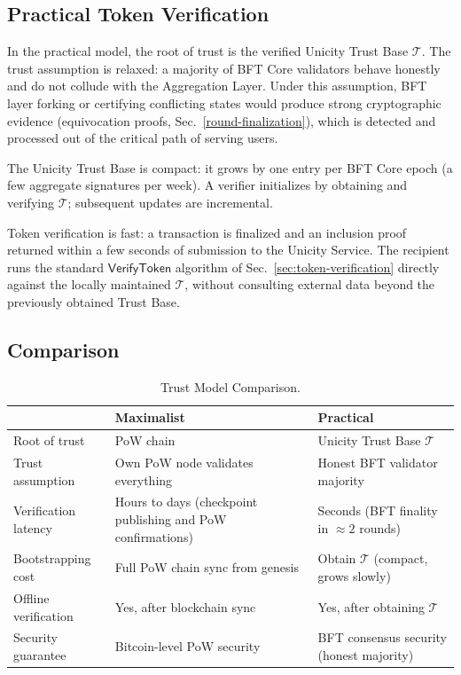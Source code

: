 \subsection{Practical Token Verification}\label{sec:practical-verification}

In the practical model, the root of trust is the verified Unicity Trust Base $\mathcal{T}$. The trust assumption is relaxed: a majority of BFT Core validators behave honestly and do not collude with the Aggregation Layer. Under this assumption, BFT layer forking or certifying conflicting states would produce strong cryptographic evidence (equivocation proofs, Sec.~\ref{round-finalization}), which is detected and processed out of the critical path of serving users.

The Unicity Trust Base is compact: it grows by one entry per BFT Core epoch (a few aggregate signatures per week). A verifier initializes by obtaining and verifying $\mathcal{T}$; subsequent updates are incremental.

Token verification is fast: a transaction is finalized and an inclusion proof returned within a few seconds of submission to the Unicity Service. The recipient runs the standard $\mathsf{VerifyToken}$ algorithm of Sec.~\ref{sec:token-verification} directly against the locally maintained $\mathcal{T}$, without consulting external data beyond the previously obtained Trust Base.


\subsection{Comparison}\label{sec:trust-comparison}

\begin{table}[!htbp]
  \begin{center}
    \caption{Trust Model Comparison.}\label{ta:trust-comparison}
    \begin{tabular}{|p{3.5cm}|p{5cm}|p{5cm}|}\hline
      & \textbf{Maximalist} & \textbf{Practical} \\\hline\hline
      Root of trust & PoW chain & Unicity Trust Base $\mathcal{T}$ \\\hline
      Trust assumption & Own PoW node validates everything & Honest BFT validator majority \\\hline
      Verification latency & Hours to days (checkpoint publishing and PoW confirmations) & Seconds (BFT finality in $\approx 2$ rounds) \\\hline
      Bootstrapping cost & Full PoW chain sync from genesis & Obtain $\mathcal{T}$ (compact, grows slowly) \\\hline
      Offline verification & Yes, after blockchain sync & Yes, after obtaining $\mathcal{T}$ \\\hline
      Security guarantee & Bitcoin-level PoW security & BFT consensus security (honest majority) \\\hline
    \end{tabular}
  \end{center}
\end{table}

